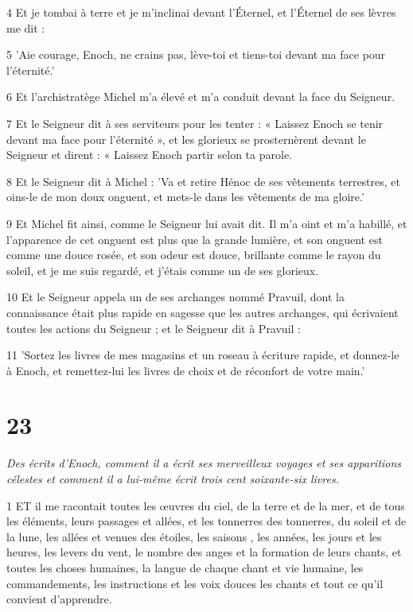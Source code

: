 \par 4 Et je tombai à terre et je m'inclinai devant l'Éternel, et l'Éternel de ses lèvres me dit :

\par 5 'Aie courage, Enoch, ne crains pas, lève-toi et tiens-toi devant ma face pour l'éternité.'

\par 6 Et l'archistratège Michel m'a élevé et m'a conduit devant la face du Seigneur.

\par 7 Et le Seigneur dit à ses serviteurs pour les tenter : « Laissez Enoch se tenir devant ma face pour l'éternité », et les glorieux se prosternèrent devant le Seigneur et dirent : « Laissez Enoch partir selon ta parole.

\par 8 Et le Seigneur dit à Michel : 'Va et retire Hénoc de ses vêtements terrestres, et oins-le de mon doux onguent, et mets-le dans les vêtements de ma gloire.'

\par 9 Et Michel fit ainsi, comme le Seigneur lui avait dit. Il m'a oint et m'a habillé, et l'apparence de cet onguent est plus que la grande lumière, et son onguent est comme une douce rosée, et son odeur est douce, brillante comme le rayon du soleil, et je me suis regardé, et j'étais comme un de ses glorieux.

\par 10 Et le Seigneur appela un de ses archanges nommé Pravuil, dont la connaissance était plus rapide en sagesse que les autres archanges, qui écrivaient toutes les actions du Seigneur ; et le Seigneur dit à Pravuil :

\par 11 'Sortez les livres de mes magasins et un roseau à écriture rapide, et donnez-le à Enoch, et remettez-lui les livres de choix et de réconfort de votre main.'



\chapter{23}

\par \textit{Des écrits d'Enoch, comment il a écrit ses merveilleux voyages et ses apparitions célestes et comment il a lui-même écrit trois cent soixante-six livres.}

\par 1 ET il me racontait toutes les œuvres du ciel, de la terre et de la mer, et de tous les éléments, leurs passages et allées, et les tonnerres des tonnerres, du soleil et de la lune, les allées et venues des étoiles, les saisons , les années, les jours et les heures, les levers du vent, le nombre des anges et la formation de leurs chants, et toutes les choses humaines, la langue de chaque chant et vie humaine, les commandements, les instructions et les voix douces les chants et tout ce qu'il convient d'apprendre.

